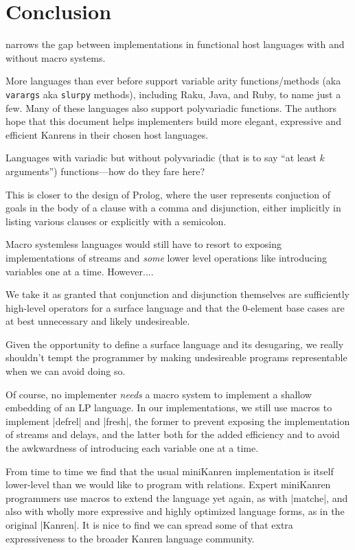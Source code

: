 \documentclass[sigplan,screen,draft,anonymous,review,natbib=false]{acmart}
\begin{document}
\section{Conclusion}\label{sec:conclusion}

narrows the gap between implementations in functional host languages
with and without macro systems.

More languages than ever before support variable arity
functions/methods (aka \verb|varargs| aka \verb|slurpy| methods),
including Raku, Java, and Ruby, to name just a few. Many of these
languages also support polyvariadic functions. The authors hope that
this document helps implementers build more elegant, expressive and
efficient Kanrens in their chosen host languages.

Languages with variadic but without polyvariadic (that is to say
\enquote{at least $k$ arguments}) functions---how do they fare here?

This is closer to the design of Prolog,
where the user represents conjuction of goals in the body of a clause
with a comma and disjunction, either implicitly in listing various
clauses or explicitly with a semicolon.

Macro systemless languages would still have to resort to exposing
implementations of streams and \emph{some} lower level operations like
introducing variables one at a time. However....

We take it as granted that conjunction and disjunction themselves are
sufficiently high-level operators for a surface language and that the
0-element base cases are at best unnecessary and likely undesireable.

Given the opportunity to define a surface language and its desugaring,
we really shouldn't tempt the programmer by making undesireable
programs representable when we can avoid doing so.

Of course, no implementer \emph{needs} a macro system to implement a
shallow embedding of an LP language. In our implementations, we still
use macros to implement \rackinline|defrel| and \rackinline|fresh|,
the former to prevent exposing the implementation of streams and
delays, and the latter both for the added efficiency and to avoid the
awkwardness of introducing each variable one at a time.

From time to time we find that the usual miniKanren implementation is
itself lower-level than we would like to program with relations.
Expert miniKanren programmers use macros to extend the language yet
again, as with \rackinline|matche|, and also with wholly more
expressive and highly optimized language forms, as in the original
\rackinline|Kanren|. It is nice to find we can spread some of that
extra expressiveness to the broader Kanren language community.
\end{document}
